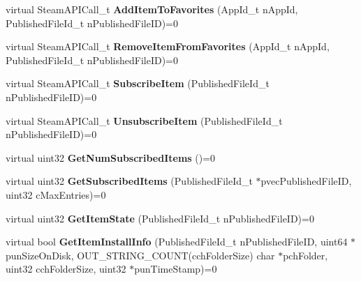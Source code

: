\begin{DoxyCompactItemize}
\mbox{\label{class_i_steam_u_g_c_aee72d92d194438dea2c5e83bd1927456}} 
virtual Steam\+A\+P\+I\+Call\+\_\+t {\bfseries Add\+Item\+To\+Favorites} (App\+Id\+\_\+t n\+App\+Id, Published\+File\+Id\+\_\+t n\+Published\+File\+ID)=0
\item 
\mbox{\label{class_i_steam_u_g_c_a1f90c626d5d0802690b9c8433a4da0b5}} 
virtual Steam\+A\+P\+I\+Call\+\_\+t {\bfseries Remove\+Item\+From\+Favorites} (App\+Id\+\_\+t n\+App\+Id, Published\+File\+Id\+\_\+t n\+Published\+File\+ID)=0
\item 
\mbox{\label{class_i_steam_u_g_c_a6f02df346f7288bef0118a10d3800ce5}} 
virtual Steam\+A\+P\+I\+Call\+\_\+t {\bfseries Subscribe\+Item} (Published\+File\+Id\+\_\+t n\+Published\+File\+ID)=0
\item 
\mbox{\label{class_i_steam_u_g_c_a26fff1983afe3e772774708e601080ba}} 
virtual Steam\+A\+P\+I\+Call\+\_\+t {\bfseries Unsubscribe\+Item} (Published\+File\+Id\+\_\+t n\+Published\+File\+ID)=0
\item 
\mbox{\label{class_i_steam_u_g_c_af95c6733e546b88cb9164e6407ebd502}} 
virtual uint32 {\bfseries Get\+Num\+Subscribed\+Items} ()=0
\item 
\mbox{\label{class_i_steam_u_g_c_a1de3ae29c325cc376cc4eb636a22e3d9}} 
virtual uint32 {\bfseries Get\+Subscribed\+Items} (Published\+File\+Id\+\_\+t $\ast$pvec\+Published\+File\+ID, uint32 c\+Max\+Entries)=0
\item 
\mbox{\label{class_i_steam_u_g_c_abae9114b1aa2460e5f4241b218f51329}} 
virtual uint32 {\bfseries Get\+Item\+State} (Published\+File\+Id\+\_\+t n\+Published\+File\+ID)=0
\item 
\mbox{\label{class_i_steam_u_g_c_a8da4eebbc548679f417dd4fe7e73ed23}} 
virtual bool {\bfseries Get\+Item\+Install\+Info} (Published\+File\+Id\+\_\+t n\+Published\+File\+ID, uint64 $\ast$pun\+Size\+On\+Disk, O\+U\+T\+\_\+\+S\+T\+R\+I\+N\+G\+\_\+\+C\+O\+U\+NT(cch\+Folder\+Size) char $\ast$pch\+Folder, uint32 cch\+Folder\+Size, uint32 $\ast$pun\+Time\+Stamp)=0
\item 

\end{DoxyCompactItemize}
